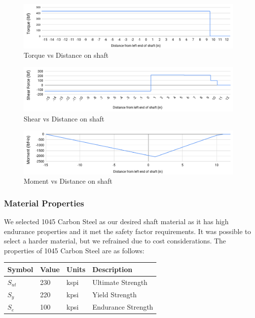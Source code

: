 \documentclass[letterpaper,12pt]{article}
\begin{document}

\begin{figure}[!h]
\centering
    \includegraphics[width=\linewidth]{A3/torque_wide.png}
    \caption{Torque vs Distance on shaft}
\end{figure}
\vspace{-5mm}
\begin{figure}[!h]
\centering
    \includegraphics[width=\linewidth]{A3/shear_wide.png}
    \caption{Shear vs Distance on shaft}
\end{figure}
\vspace{-5mm}
\begin{figure}[!h]
\centering
    \includegraphics[width=\linewidth]{A3/moment_wide.png}
     \caption{Moment vs Distance on shaft}
\end{figure}

\subsubsection{Material Properties}

We selected 1045 Carbon Steel as our desired shaft material as it has high endurance properties and it met the safety factor requirements. It was possible to select a harder material, but we refrained due to cost considerations. The properties of 1045 Carbon Steel are as follows:

\begin{center}
	\begin{tabular}{ |p{1.5cm}||p{1cm}|p{2cm}|p{7cm}|  }
		\hline
		Symbol & Value & Units & Description\\
		\hline
		$S_{ut}$ & 230 & kspi & Ultimate Strength\\
        $S_y$ & 220 & kpsi  & Yield Strength\\			
		$S_e$ & 100 & kpsi  & Endurance Strength\\
		\hline
	\end{tabular}
\end{center}
\end{document}

